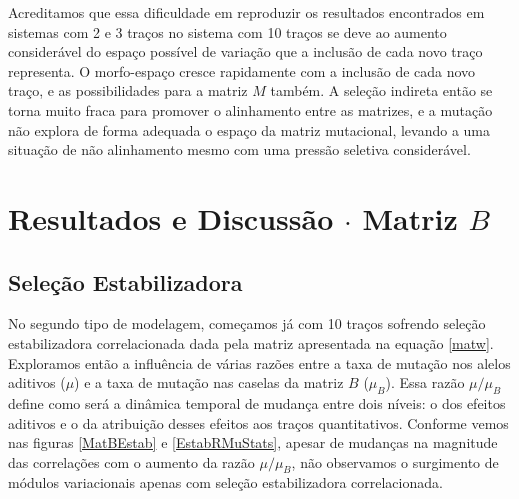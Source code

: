 Acreditamos que essa dificuldade em reproduzir os resultados encontrados
em sistemas com 2 e 3 traços no sistema com 10 traços se deve ao aumento
considerável do espaço possível de variação que a inclusão de cada novo
traço representa. 
O morfo-espaço cresce rapidamente com a inclusão de cada novo traço, e
as possibilidades para a matriz $M$ também. 
A seleção indireta então se torna muito fraca para promover o
alinhamento entre as matrizes, e a mutação não explora de forma adequada
o espaço da matriz mutacional, levando a uma situação de não alinhamento
mesmo com uma pressão seletiva considerável. 

\section{Resultados e Discussão $\cdot$ Matriz $B$}

\subsection{Seleção Estabilizadora}

No segundo tipo de modelagem, começamos já com 10 traços sofrendo
seleção estabilizadora correlacionada dada pela matriz apresentada na
equação \ref{matw}. 
Exploramos então a influência de várias razões entre a taxa de mutação
nos alelos aditivos ($\mu$) e a taxa de mutação nas caselas da matriz
$B$ ($\mu_B$). 
Essa razão $\mu/\mu_B$ define como será a dinâmica temporal de mudança
entre dois níveis: o dos efeitos aditivos e o da atribuição desses
efeitos aos traços quantitativos. 
Conforme vemos nas figuras \ref{MatBEstab} e \ref{EstabRMuStats}, apesar de mudanças na
magnitude das correlações com o aumento da razão $\mu/\mu_B$, não
observamos o surgimento de módulos variacionais apenas com seleção
estabilizadora correlacionada. 

